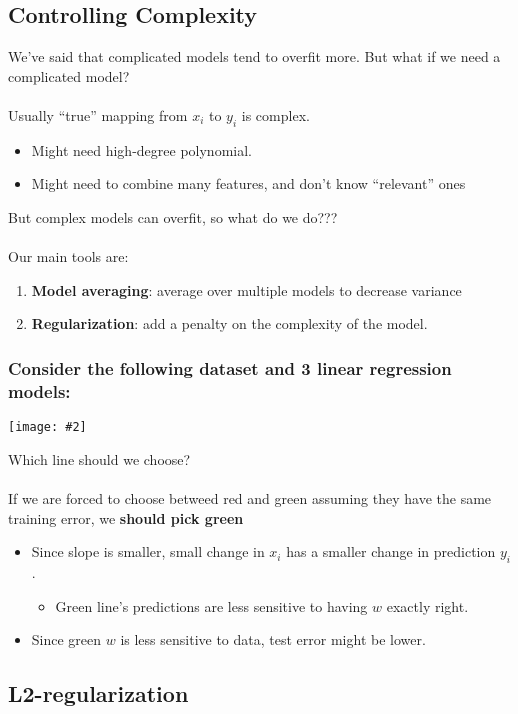 \documentclass{article}
\def\blu#1{{\color{blu}#1}}
\def\gre#1{{\color{gre}#1}}
\def\red#1{{\color{red}#1}}
\theoremstyle{definition}
\newcommand{\centerfig}[2]{\begin{center}\texttt{[image: \#2]}\end{center}}
\begin{document}
\subsection*{Controlling Complexity}
We’ve said that \red{complicated models tend to overfit more}. But what if we need a complicated model? \\ \\
Usually \red{“true” mapping from $ x_i $ to $ y_i $ is complex.}
\begin{itemize}
	\item Might need high-degree polynomial.
	\item Might need to combine many features, and don’t know “relevant” ones
\end{itemize}
But complex models can overfit, so what do we do??? \\ \\
Our main tools are:
\begin{enumerate}
	\item \blu{\textbf{Model averaging}}: average over multiple models to decrease variance
	\item \blu{\textbf{Regularization}}: add a \gre{penalty on the complexity} of the model.
\end{enumerate}
\subsubsection*{Consider the following dataset and 3 linear regression models:}
\centerfig{0.5}{comp-pen-2}
Which line should we choose? \\ \\
If we are forced to choose betweed \red{red} and \gre{green} assuming they have the same training error, we \textbf{\gre{should pick green}}
\begin{itemize}
	\item Since slope is smaller, \gre{small change in $ x_i $ has a smaller change in prediction $ y_i $}.
	\begin{itemize}
		\item Green line’s predictions are \gre{less sensitive to having $ w $ exactly right}.
	\end{itemize}
	\item Since green $ w $ is less sensitive to data, test error might be lower.
\end{itemize}
 \subsection*{L2-regularization}
 
\end{document}
